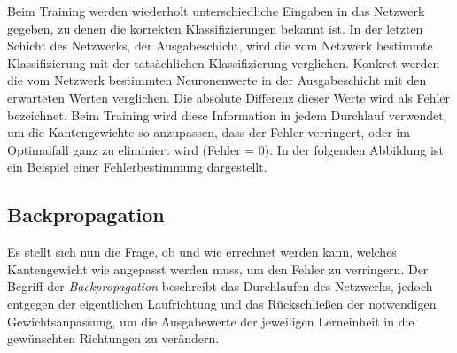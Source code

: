 Beim Training werden wiederholt unterschiedliche Eingaben in das Netzwerk gegeben,
zu denen die korrekten Klassifizierungen bekannt ist. In der letzten Schicht
des Netzwerks, der Ausgabeschicht, wird die vom Netzwerk bestimmte
Klassifizierung mit der tatsächlichen Klassifizierung verglichen.
Konkret werden die vom Netzwerk bestimmten Neuronenwerte in der Ausgabeschicht
mit den erwarteten Werten verglichen. Die absolute Differenz dieser Werte wird
als Fehler bezeichnet.
Beim Training wird diese Information in jedem Durchlauf verwendet, um die
Kantengewichte so anzupassen, dass der Fehler verringert, oder im
Optimalfall ganz zu eliminiert wird (Fehler = 0).
In der folgenden Abbildung ist ein Beispiel einer Fehlerbestimmung dargestellt.\bigskip

\begin{figure}[H]
    \centering
\end{figure}

\subsection{Backpropagation}

Es stellt sich nun die Frage, ob und wie errechnet werden kann, welches
Kantengewicht wie angepasst werden muss, um den Fehler zu verringern.
Der Begriff der \emph{Backpropagation} beschreibt das Durchlaufen des Netzwerks,
jedoch entgegen der eigentlichen Laufrichtung und das Rückschließen der
notwendigen Gewichtsanpassung, um die Ausgabewerte der jeweiligen Lerneinheit
in die gewünschten Richtungen zu verändern.

